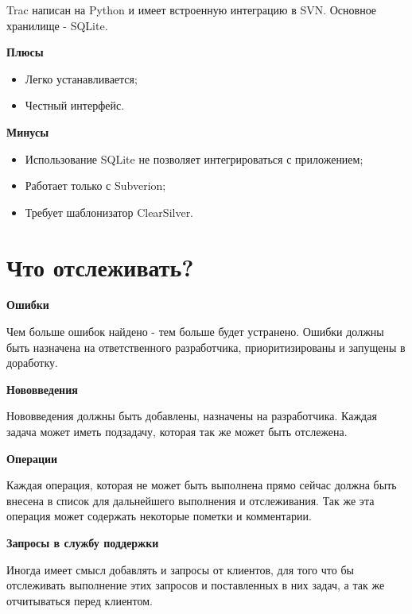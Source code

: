 Trac написан на Python и имеет встроенную интеграцию в SVN. Основное хранилище - SQLite.

\textbf{Плюсы}

\begin{itemize}

\item Легко устанавливается;

\item Честный интерфейс.

\end{itemize}

\textbf{Минусы}

\begin{itemize}

\item Использование SQLite не позволяет интегрироваться с приложением;

\item Работает только с Subverion;

\item Требует шаблонизатор ClearSilver.

\end{itemize}


\section{ Что отслеживать? } \label{sect2_17}

\textbf{ Ошибки }%

Чем больше ошибок найдено - тем больше будет устранено. Ошибки должны быть назначена на ответственного разработчика, приоритизированы и запущены в доработку.

\textbf{ Нововведения } %

Нововведения должны быть добавлены, назначены на разработчика. Каждая задача может иметь подзадачу, которая так же может быть отслежена.

\textbf{ Операции } %

Каждая операция, которая не может быть выполнена прямо сейчас должна быть внесена в список для дальнейшего выполнения и отслеживания. Так же эта операция может содержать некоторые пометки и комментарии.

\textbf{ Запросы в службу поддержки } %

Иногда имеет смысл добавлять и запросы от клиентов, для того что бы отслеживать выполнение этих запросов и поставленных в них задач, а так же отчитываться перед клиентом.

